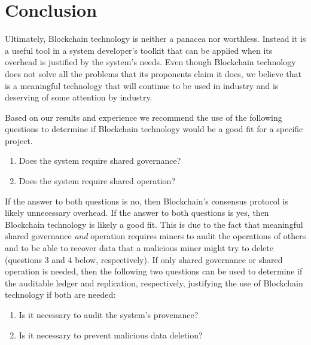 

\section{Conclusion}
Ultimately, Blockchain technology is neither a panacea nor worthless.
Instead it is a useful tool in a system developer's toolkit that can be applied when its overhead is justified by the system's needs.
Even though Blockchain technology does not solve all the problems that its proponents claim it does, we believe that is a meaningful technology that will continue to be used in industry and is deserving of some attention by industry.

Based on our results and experience we recommend the use of the following questions to determine if Blockchain technology would be a good fit for a specific project.%

\begin{enumerate}
	\item Does the system require shared governance?
	\item Does the system require shared operation?
\end{enumerate}

If the answer to both questions is no, then Blockchain's consensus protocol is likely unnecessary overhead. If the answer to both questions is yes, then Blockchain technology is likely a good fit. This is due to the fact that meaningful shared governance \emph{and} operation requires miners to audit the operations of others and to be able to recover data that a malicious miner might try to delete (questions 3 and 4 below, respectively). If only shared governance or shared operation is needed, then the following two questions can be used to determine if the auditable ledger and replication, respectively, justifying the use of Blockchain technology if both are needed:

\begin{enumerate}[start=3]
	\item Is it necessary to audit the system's provenance?
	\item Is it necessary to prevent malicious data deletion?
\end{enumerate}


